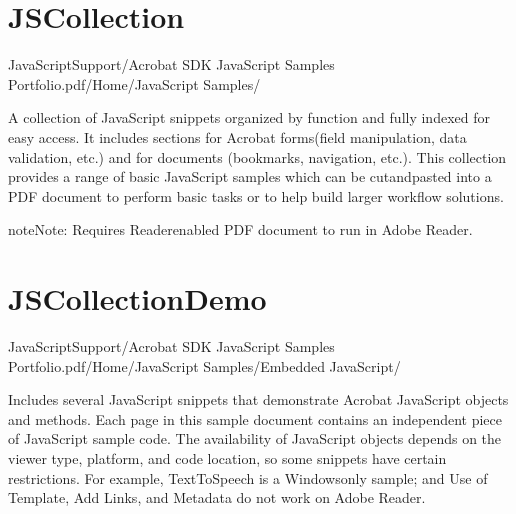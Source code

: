 \documentclass[letterpaper,12pt,english,openany,oneside]{sphinxmanual}
\begin{document}
\section{JSCollection}
\label{\detokenize{Samples_JavaScript:jscollection}}\label{\detokenize{Samples_JavaScript:location-10}}

JavaScriptSupport/Acrobat SDK JavaScript Samples Portfolio.pdf/Home/JavaScript Samples/

\label{\detokenize{Samples_JavaScript:description-10}}

A collection of JavaScript snippets organized by function and fully indexed for easy access. It includes sections for Acrobat forms(field manipulation, data validation, etc.) and for documents (bookmarks, navigation, etc.). This collection provides a range of basic JavaScript samples which can be cut\sphinxhyphen{}and\sphinxhyphen{}pasted into a PDF document to perform basic tasks or to help build larger workflow solutions.

\begin{sphinxadmonition}{note}{Note:}
Requires Reader\sphinxhyphen{}enabled PDF document to run in Adobe Reader.
\end{sphinxadmonition}


\section{JSCollectionDemo}
\label{\detokenize{Samples_JavaScript:jscollectiondemo}}\label{\detokenize{Samples_JavaScript:location-11}}

JavaScriptSupport/Acrobat SDK JavaScript Samples Portfolio.pdf/Home/JavaScript Samples/Embedded JavaScript/

\label{\detokenize{Samples_JavaScript:description-11}}

Includes several JavaScript snippets that demonstrate Acrobat JavaScript objects and methods. Each page in this sample document contains an independent piece of JavaScript sample code. The availability of JavaScript objects depends on the viewer type, platform, and code location, so some snippets have certain restrictions. For example, Text\sphinxhyphen{}To\sphinxhyphen{}Speech is a Windows\sphinxhyphen{}only sample; and Use of Template, Add Links, and Metadata do not work on Adobe Reader.
\end{document}
